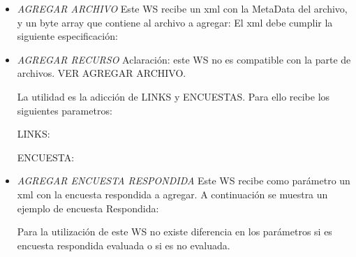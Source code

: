 \documentclass{article}
\begin{document}
\begin{description}
\begin{itemize}
			\item \emph{AGREGAR ARCHIVO}
				Este WS recibe un xml con la MetaData del archivo, y un byte array que contiene al archivo a agregar:
				El xml debe cumplir la siguiente especificaci\'on:
				
				
			
			\clearpage
			\item \emph{AGREGAR RECURSO} Aclaraci\'on: este WS no es compatible con la parte de archivos. VER AGREGAR ARCHIVO.
			\begin{description}
				La utilidad es la adicci\'on de LINKS y ENCUESTAS.
				Para ello recibe los siguientes parametros:
				
				 LINKS:
				 
				 	
				 
				 ENCUESTA:
				 
				 	
			\end{description}
			
			\clearpage
			\item \emph{AGREGAR ENCUESTA RESPONDIDA}
			Este WS recibe como par\'ametro un xml con la encuesta respondida a agregar. A continuaci\'on se muestra un ejemplo de encuesta Respondida:
			
			
			
			Para la utilizaci\'on de este WS no existe diferencia en los par\'ametros si es encuesta respondida evaluada o si es no evaluada.\newline			
			


\end{itemize}
\end{description}
\end{document}
